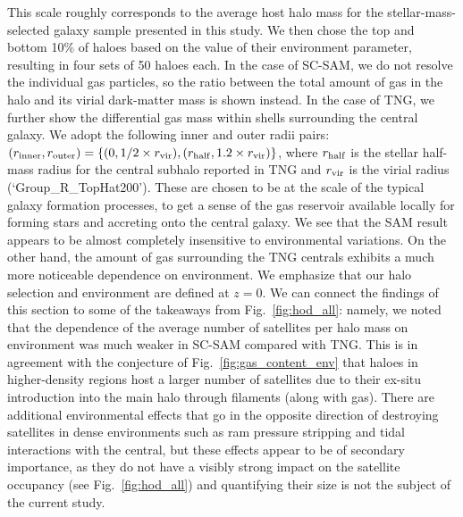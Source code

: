 \documentclass[fleqn,usenatbib]{mnras}
\newcommand{\rss}[1]{\textcolor{purple}{(rss: #1)}}
\begin{document}
This scale roughly corresponds to the average host halo mass for the stellar-mass-selected galaxy sample presented in this study. We then chose the top and bottom 10\% of haloes based on the value of their environment parameter, resulting in four sets of 50 haloes each. In the case of SC-SAM, we do not resolve the individual gas particles, so the ratio between the total amount of gas in the halo and its virial dark-matter mass is shown instead. In the case of TNG, we further show the differential gas mass within shells surrounding the central galaxy. We adopt the following inner and outer radii pairs: $(r_{\rm inner}, r_{\rm outer}) = \{(0, 1/2 \times r_{\rm vir}), (r_{\rm half}, 1.2 \times r_{\rm vir})\}$, where $r_{\rm half}$ is the stellar half-mass radius for the central subhalo reported in TNG and $r_{\rm vir}$ is the virial radius (`Group\_R\_TopHat200'). 
These are chosen to be at the scale of the typical galaxy formation processes, to get a sense of the gas reservoir available locally for forming stars and accreting onto the central galaxy. We see that the SAM result appears to be almost completely insensitive to environmental variations.
On the other hand, the amount of gas surrounding the TNG centrals exhibits a much more noticeable dependence on environment. We emphasize that our halo selection and environment are defined at $z = 0$. We can connect the findings of this section to some of the takeaways from Fig.~\ref{fig:hod_all}: namely, we noted that the dependence of the average number of satellites per halo mass on environment was much weaker in SC-SAM compared with TNG. This is in agreement with the conjecture of Fig.~\ref{fig:gas_content_env} that haloes in higher-density regions host a larger number of satellites due to their ex-situ introduction into the main halo through filaments (along with gas).
There are additional environmental effects that go in the opposite direction of destroying satellites in dense environments such as ram pressure stripping and tidal interactions with the central, but these effects appear to be of secondary importance, as they do not have a visibly strong impact on the satellite occupancy (see Fig.~\ref{fig:hod_all}) and quantifying their size is not the subject of the current study.
\end{document}
